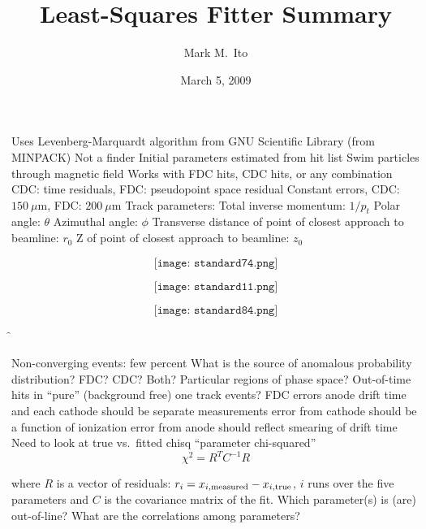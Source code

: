 \documentclass[xcolor=dvipsnames]{beamer}
\begin{document}
\title{Least-Squares Fitter Summary}
\author[M.\ Ito]{Mark M.\ Ito}
\date{March 5, 2009}

\f{
\bi
\I Uses Levenberg-Marquardt algorithm from GNU Scientific Library (from MINPACK)
\I Not a finder
\I Initial parameters estimated from hit list
\I Swim particles through magnetic field
\I Works with FDC hits, CDC hits, or any combination
\I CDC: time residuals, FDC: pseudopoint space residual
\I Constant errors, CDC: $150~\mu$m, FDC: $200~\mu$m
\I Track parameters:
  \be
  \I Total inverse momentum: $1/p_t$
  \I Polar angle: $\theta$
  \I Azimuthal angle: $\phi$
  \I Transverse distance of point of closest approach to beamline: $r_0$
  \I Z of point of closest approach to beamline: $z_0$
  \ee
\ei
}

\f{
$$
\texttt{[image: standard74.png]}
$$
}

\f{
$$
\texttt{[image: standard11.png]}
$$
}

\f{
$$
\texttt{[image: standard84.png]}
$$
}

\f{
\be
\I Non-converging events: few percent
\I What is the source of anomalous probability distribution?
  \be
  \I FDC? CDC? Both?
  \I Particular regions of phase space?
  \I Out-of-time hits in ``pure'' (background free) one track events?
  \ee
\I FDC errors
  \be
  \I anode drift time and each cathode should be separate measurements
  \I error from cathode should be a function of ionization
  \I error from anode should reflect smearing of drift time
  \ee
\I Need to look at true vs.\ fitted chisq ``parameter chi-squared''
$$
\chi^2 = R^T C^{-1} R
$$

where $R$ is a vector of residuals: $r_i = x_{i,{\rm measured}} - x_{i,{\rm true}}$, $i$ runs over the five parameters and $C$ is the covariance
matrix of the fit.
  \be
  \I Which parameter(s) is (are) out-of-line?
  \I What are the correlations among parameters?
  \ee
\ee
}
\end{document}
